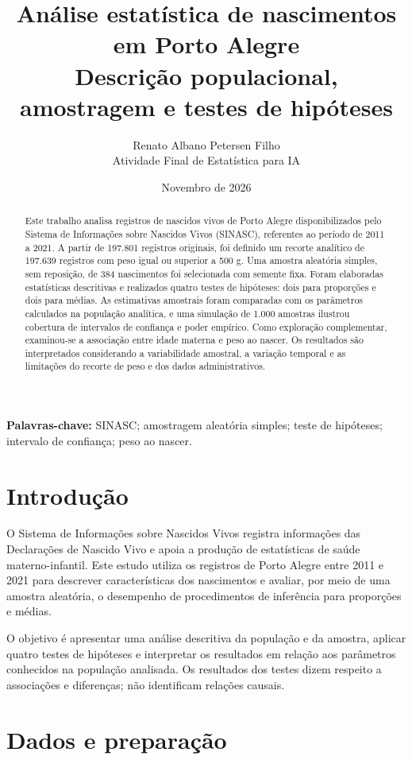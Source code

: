 \documentclass[12pt,a4paper]{article}
\title{\textbf{Análise estatística de nascimentos em Porto Alegre}\\
\large Descrição populacional, amostragem e testes de hipóteses}
\author{Renato Albano Petersen Filho\\
\normalsize Atividade Final de Estatística para IA}
\date{Novembro de 2026}
\begin{document}
\maketitle

\begin{abstract}
Este trabalho analisa registros de nascidos vivos de Porto Alegre disponibilizados pelo Sistema de Informações sobre Nascidos Vivos (SINASC), referentes ao período de 2011 a 2021. A partir de 197.801 registros originais, foi definido um recorte analítico de 197.639 registros com peso igual ou superior a 500 g. Uma amostra aleatória simples, sem reposição, de 384 nascimentos foi selecionada com semente fixa. Foram elaboradas estatísticas descritivas e realizados quatro testes de hipóteses: dois para proporções e dois para médias. As estimativas amostrais foram comparadas com os parâmetros calculados na população analítica, e uma simulação de 1.000 amostras ilustrou cobertura de intervalos de confiança e poder empírico. Como exploração complementar, examinou-se a associação entre idade materna e peso ao nascer. Os resultados são interpretados considerando a variabilidade amostral, a variação temporal e as limitações do recorte de peso e dos dados administrativos.
\end{abstract}

\noindent\textbf{Palavras-chave:} SINASC; amostragem aleatória simples; teste de hipóteses; intervalo de confiança; peso ao nascer.

\section{Introdução}

O Sistema de Informações sobre Nascidos Vivos registra informações das Declarações de Nascido Vivo e apoia a produção de estatísticas de saúde materno-infantil. Este estudo utiliza os registros de Porto Alegre entre 2011 e 2021 para descrever características dos nascimentos e avaliar, por meio de uma amostra aleatória, o desempenho de procedimentos de inferência para proporções e médias.

O objetivo é apresentar uma análise descritiva da população e da amostra, aplicar quatro testes de hipóteses e interpretar os resultados em relação aos parâmetros conhecidos na população analisada. Os resultados dos testes dizem respeito a associações e diferenças; não identificam relações causais.

\section{Dados e preparação}
\end{document}
